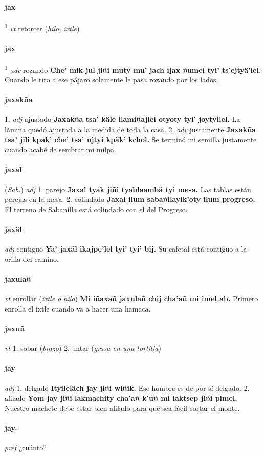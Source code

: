 \documentclass{scrbook}
\newcommand{\entry}[1]{\paragraph{#1}}
\newcommand{\onedefinition}[1]{#1.}
\newcommand{\defsuperscript}[1]{\textsuperscript{1}}
\newcommand{\partofspeech}[1]{\textit{#1}}
\newcommand{\spanishtranslation}[1]{#1}
\newcommand{\clarification}[1]{(\textit{#1})}
\newcommand{\cholexample}[1]{\textbf{#1}}
\newcommand{\exampletranslation}[1]{#1}
\newcommand{\relevantdialect}[1]{(\textit{#1})}
\begin{document}
\begin{multicols}{2}
\entry{jax}
\defsuperscript{1}
\partofspeech{vt}
\spanishtranslation{retorcer}
\clarification{hilo, ixtle}

\entry{jax}
\defsuperscript{2}
\partofspeech{adv}
\spanishtranslation{rozando}
\cholexample{Che' mik jul jiñi muty mu' jach ijax ñumel tyi' ts'ejtyä'lel.}
\exampletranslation{Cuando le tiro a ese pájaro solamente le pasa rozando por los lados.}

\entry{jaxakña}
\onedefinition{1}
\partofspeech{adj}
\spanishtranslation{ajustado}
\cholexample{Jaxakña tsa' käle ilamiñajlel otyoty tyi' joytyilel.}
\exampletranslation{La lámina quedó ajustada a la medida de toda la casa.}
\onedefinition{2}
\partofspeech{adv}
\spanishtranslation{justamente}
\cholexample{Jaxakña tsa' jili kpak' che' tsa' ujtyi kpäk' kchol.}
\exampletranslation{Se terminó mi semilla justamente cuando acabé de sembrar mi milpa.}

\entry{jaxal}
\relevantdialect{Sab.}
\partofspeech{adj}
\onedefinition{1}
\spanishtranslation{parejo}
\cholexample{Jaxal tyak jiñi tyablaambä tyi mesa.}
\exampletranslation{Las tablas están parejas en la mesa.}
\onedefinition{2}
\spanishtranslation{colindado}
\cholexample{Jaxal ilum sabañilayik'oty ilum progreso.}
\exampletranslation{El terreno de Sabanilla está colindado con el del Progreso.}

\entry{jaxäl}
\partofspeech{adj}
\spanishtranslation{contiguo}
\cholexample{Ya' jaxäl ikajpe'lel tyi' tyi' bij.}
\exampletranslation{Su cafetal está contiguo a la orilla del camino.}

\entry{jaxulañ}
\partofspeech{vt}
\spanishtranslation{enrollar}
\clarification{ixtle o hilo}
\cholexample{Mi iñaxañ jaxulañ chij cha'añ mi imel ab.}
\exampletranslation{Primero enrolla el ixtle cuando va a hacer una hamaca.}

\entry{jaxuñ}
\partofspeech{vt}
\onedefinition{1}
\spanishtranslation{sobar}
\clarification{brazo}
\onedefinition{2}
\spanishtranslation{untar}
\clarification{grasa en una tortilla}

\entry{jay}
\partofspeech{adj}
\onedefinition{1}
\spanishtranslation{delgado}
\cholexample{Ityileläch jay jiñi wiñik.}
\exampletranslation{Ese hombre es de por sí delgado.}
\onedefinition{2}
\spanishtranslation{afilado}
\cholexample{Yom jay jiñi lakmachity cha'añ k'uñ mi laktsep jiñi pimel.}
\exampletranslation{Nuestro machete debe estar bien afilado para que sea fácil cortar el monte.}

\entry{jay-}
\partofspeech{pref}
\spanishtranslation{¿cuánto?}


\end{multicols}
\end{document}
